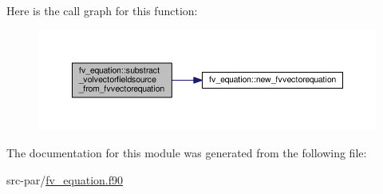 Here is the call graph for this function\-:\nopagebreak
\begin{figure}[H]
\begin{center}
\leavevmode
\includegraphics[width=350pt]{classfv__equation_a3d4afbd5ad280d482ba99f117913ecd4_cgraph}
\end{center}
\end{figure}




The documentation for this module was generated from the following file\-:\begin{DoxyCompactItemize}
\item 
src-\/par/\hyperlink{fv__equation_8f90}{fv\-\_\-equation.\-f90}\end{DoxyCompactItemize}
